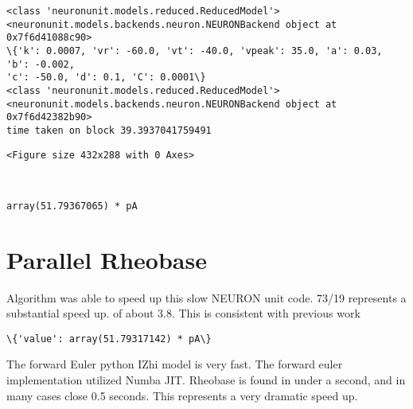 \documentclass[11pt]{article}
\begin{document}
    \begin{Verbatim}[commandchars=\\\{\}]
<class 'neuronunit.models.reduced.ReducedModel'>
<neuronunit.models.backends.neuron.NEURONBackend object at 0x7f6d41088c90>
\{'k': 0.0007, 'vr': -60.0, 'vt': -40.0, 'vpeak': 35.0, 'a': 0.03, 'b': -0.002,
'c': -50.0, 'd': 0.1, 'C': 0.0001\}
<class 'neuronunit.models.reduced.ReducedModel'>
<neuronunit.models.backends.neuron.NEURONBackend object at 0x7f6d42382b90>
time taken on block 39.3937041759491
    \end{Verbatim}

    
    \begin{verbatim}
<Figure size 432x288 with 0 Axes>
    \end{verbatim}

    
    \begin{center}
    \end{center}
    { \hspace*{\fill} \\}
    
            \begin{tcolorbox}[breakable, size=fbox, boxrule=.5pt, pad at break*=1mm, opacityfill=0]
\begin{Verbatim}[commandchars=\\\{\}]
array(51.79367065) * pA
\end{Verbatim}
\end{tcolorbox}
        
    \hypertarget{parallel-rheobase}{%
\section{Parallel Rheobase}\label{parallel-rheobase}}

Algorithm was able to speed up this slow NEURON unit code. 73/19
represents a substantial speed up. of about 3.8. This is consistent with
previous work

            \begin{tcolorbox}[breakable, size=fbox, boxrule=.5pt, pad at break*=1mm, opacityfill=0]
\begin{Verbatim}[commandchars=\\\{\}]
\{'value': array(51.79317142) * pA\}
\end{Verbatim}
\end{tcolorbox}
        
    The forward Euler python IZhi model is very fast. The forward euler
implementation utilized Numba JIT. Rheobase is found in under a second,
and in many cases close 0.5 seconds. This represents a very dramatic
speed up.
\end{document}
